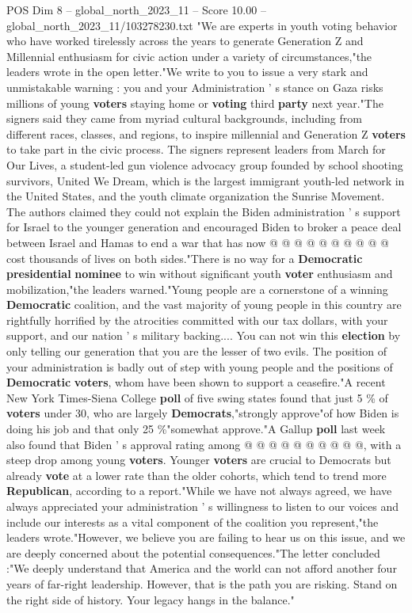 \begin{textsample}{POS Dim 8 – global\_north\_2023\_11 – Score 10.00 – global\_north\_2023\_11/103278230.txt}  \label{ex:f8_pos_126}
"We are experts in youth voting behavior who have worked tirelessly across the years to generate Generation Z and Millennial enthusiasm for civic action under a variety of circumstances,"the leaders wrote in the open letter."We write to you to issue a very stark and unmistakable warning : you and your Administration ' s stance on Gaza risks millions of young \textbf{voters} staying home or \textbf{voting} third \textbf{party} next year."The signers said they came from myriad cultural backgrounds, including from different races, classes, and regions, to inspire millennial and Generation Z \textbf{voters} to take part in the civic process.
The signers represent leaders from March for Our Lives, a student-led gun violence advocacy group founded by school shooting survivors, United We Dream, which is the largest immigrant youth-led network in the United States, and the youth climate organization the Sunrise Movement.
The authors claimed they could not explain the Biden administration ' s support for Israel to the younger generation and encouraged Biden to broker a peace deal between Israel and Hamas to end a war that has now @ @ @ @ @ @ @ @ @ @ cost thousands of lives on both sides."There is no way for a \textbf{Democratic} \textbf{presidential} \textbf{nominee} to win without significant youth \textbf{voter} enthusiasm and mobilization,"the leaders warned."Young people are a cornerstone of a winning \textbf{Democratic} coalition, and the vast majority of young people in this country are rightfully horrified by the atrocities committed with our tax dollars, with your support, and our nation ' s military backing....
You can not win this \textbf{election} by only telling our generation that you are the lesser of two evils.
The position of your administration is badly out of step with young people and the positions of \textbf{Democratic} \textbf{voters}, whom have been shown to support a ceasefire."A recent New York Times-Siena College \textbf{poll} of five swing states found that just 5 \% of \textbf{voters} under 30, who are largely \textbf{Democrats},"strongly approve"of how Biden is doing his job and that only 25 \%"somewhat approve."A Gallup \textbf{poll} last week also found that Biden ' s approval rating among @ @ @ @ @ @ @ @ @ @, with a steep drop among young \textbf{voters}.
Younger \textbf{voters} are crucial to Democrats but already \textbf{vote} at a lower rate than the older cohorts, which tend to trend more \textbf{Republican}, according to a report."While we have not always agreed, we have always appreciated your administration ' s willingness to listen to our voices and include our interests as a vital component of the coalition you represent,"the leaders wrote."However, we believe you are failing to hear us on this issue, and we are deeply concerned about the potential consequences."The letter concluded :"We deeply understand that America and the world can not afford another four years of far-right leadership.
However, that is the path you are risking.
Stand on the right side of history.
Your legacy hangs in the balance."

\end{textsample}
